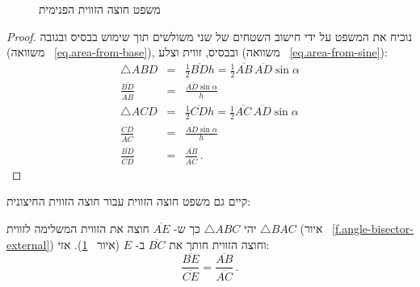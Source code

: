 \begin{figure}[b]
\begin{center}
\end{center}
\caption{משפט חוצה הזווית הפנימית}\label{f.angle-bisector}
\end{figure}
\begin{proof}
נוכיח את המשפט על ידי חישוב השטחים של שני משולשים תוך שימוש בבסיס ובגובה (משוואה%
~\ref{eq.area-from-base}),
ובבסיס, זווית וצלע (משוואה%
~\ref{eq.area-from-sine}):
\begin{eqnarray*}
\triangle ABD&=&\frac{1}{2}\overline{BD}h=\frac{1}{2}\overline{AB}\,\overline{AD}\sin \alpha\\
\frac{\overline{BD}}{\overline{AB}}&=&\frac{\overline{AD}\sin \alpha}{h}\\
\triangle ACD&=&\frac{1}{2}\overline{CD}h=\frac{1}{2}\overline{AC}\,\overline{AD}\sin \alpha\\
\frac{\overline{CD}}{\overline{AC}}&=&\frac{\overline{AD}\sin \alpha}{h}\\
\frac{\overline{BD}}{\overline{CD}}&=&\frac{\overline{AB}}{\overline{AC}}\,.
\end{eqnarray*}
\end{proof}

קיים גם משפט חוצה הזווית עבור חוצה הזווית החיצונית:
\begin{theorem}\label{thm.external-angle-bisector}
יהי
$\triangle ABC$
כך ש-%
$\overline{AE}$
חוצה את הזווית המשלימה לזווית
$\triangle BAC$
(איור%
~\ref{f.angle-bisector-external})
וחוצה הזווית חותך את
$\overline{BC}$
ב-%
$E$
(איור%
~\ref{f.angle-bisector}).
אזי:
\[
\frac {\overline{BE}}{\overline{CE}}=\frac {\overline{AB}}{\overline{AC}}\,.
\]
\end{theorem}

